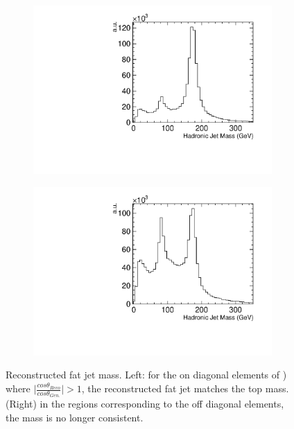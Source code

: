 \begin{figure}
  \centering
  \begin{subfigure}{.5\textwidth}
    \centering
    \includegraphics[width=1.0\textwidth]{TopAnalysis/figures/TopMassDiagonal.pdf}
  \end{subfigure}%
  \begin{subfigure}{.5\textwidth}
    \centering\captionsetup{width=.8\linewidth}%
    \includegraphics[width=1.0\textwidth]{TopAnalysis/figures/TopMassOffDiagonal.pdf}
  \end{subfigure}
  \caption[Reconstructed fat jet mass]{Reconstructed fat jet mass. Left: for the on diagonal elements of ) where $\mid\frac{cos\theta_{Reco}}{cos\theta_{Gen.}}\mid >1$, the reconstructed fat jet matches the top mass. (Right) in the regions corresponding to the off diagonal elements, the mass is no longer consistent.}
  \label{fig:diagonalTopMass}
\end{figure}


